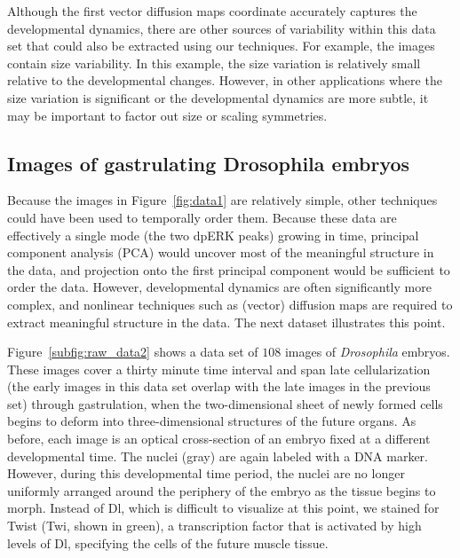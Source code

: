 \documentclass{pnastwo}
\begin{document}
\begin{article}
Although the first vector diffusion maps coordinate accurately captures the developmental dynamics, there are other sources of variability within this data set that could also be extracted using our techniques. 
%
For example, the images contain size variability. 
%
In this example, the size variation is relatively small relative to the developmental changes. 
%
However, in other applications where the size variation is significant or the developmental dynamics are more subtle, it may be important to factor out size or scaling symmetries.

%

\subsection{Images of gastrulating  {\subsectionitfont Drosophila} embryos}

Because the images in Figure~\ref{fig:data1} are relatively simple, other techniques could have been used to temporally order them. 
%
Because these data are effectively a single mode (the two dpERK peaks) growing in time,
principal component analysis (PCA) \cite{shlens2005tutorial} would uncover most of the meaningful structure in the data, and projection onto the first principal component would be sufficient to order the data.
%
However, developmental dynamics are often significantly more complex, and nonlinear techniques such as (vector) diffusion maps are required to extract meaningful structure in the data. 
%
The next dataset illustrates this point.

Figure~\ref{subfig:raw_data2} shows a data set of $108$ images of {\it Drosophila} embryos.
%
These images cover a thirty minute time interval and span late cellularization (the early images in this data set overlap with the late images in the previous set) through gastrulation, when the two-dimensional sheet of newly formed cells begins to deform into three-dimensional structures of the future organs. 
%
As before, each image is an optical cross-section of an embryo fixed at a different developmental time.
%
The nuclei (gray) are again labeled with a DNA marker.
%
However, during this developmental time period, the nuclei are no longer uniformly arranged around the periphery of the embryo as the tissue begins to morph.
%
Instead of Dl, which is difficult to visualize at this point, we stained for Twist (Twi, shown in green), a transcription factor that is activated by high levels of Dl, specifying the cells of the future muscle tissue.
%


\end{article}
\end{document}

